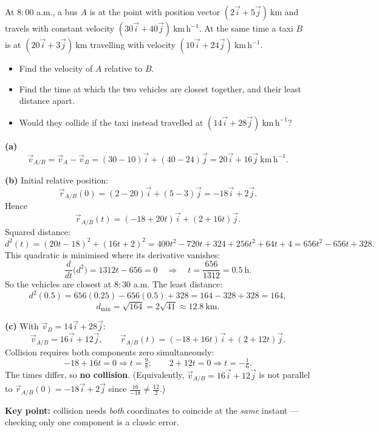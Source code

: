 \documentclass[11pt]{article}
\begin{document}
\begin{exoresolu}
At $8{:}00$ a.m., a bus $A$ is at the point with position vector $(2\vec{i} + 5\vec{j})\ \mathrm{km}$ and travels with constant velocity $(30\vec{i} + 40\vec{j})\ \mathrm{km\,h^{-1}}$. At the same time a taxi $B$ is at $(20\vec{i} + 3\vec{j})\ \mathrm{km}$ travelling with velocity $(10\vec{i} + 24\vec{j})\ \mathrm{km\,h^{-1}}$.
\begin{itemize}
\item[(a)] Find the velocity of $A$ relative to $B$.
\item[(b)] Find the time at which the two vehicles are closest together, and their least distance apart.
\item[(c)] Would they collide if the taxi instead travelled at $(14\vec{i} + 28\vec{j})\ \mathrm{km\,h^{-1}}$?
\end{itemize}
\tcblower
\textbf{(a)}
\[ \vec{v}_{A/B} = \vec{v}_A - \vec{v}_B = (30-10)\vec{i} + (40-24)\vec{j} = 20\vec{i} + 16\vec{j}\ \mathrm{km\,h^{-1}}. \]

\textbf{(b)} Initial relative position:
\[ \vec{r}_{A/B}(0) = (2-20)\vec{i} + (5-3)\vec{j} = -18\vec{i} + 2\vec{j}. \]
Hence
\[ \vec{r}_{A/B}(t) = (-18 + 20t)\vec{i} + (2 + 16t)\vec{j}. \]
Squared distance:
\[ d^2(t) = (20t - 18)^2 + (16t + 2)^2 = 400t^2 - 720t + 324 + 256t^2 + 64t + 4 = 656t^2 - 656t + 328. \]
This quadratic is minimised where its derivative vanishes:
\[ \frac{d}{dt}\big(d^2\big) = 1312t - 656 = 0 \quad\Longrightarrow\quad t = \frac{656}{1312} = 0.5\ \mathrm{h}. \]
So the vehicles are closest at $8{:}30$ a.m. The least distance:
\[ d^2(0.5) = 656(0.25) - 656(0.5) + 328 = 164 - 328 + 328 = 164, \]
\[ d_{\min} = \sqrt{164} = 2\sqrt{41} \approx 12.8\ \mathrm{km}. \]

\textbf{(c)} With $\vec{v}_B = 14\vec{i} + 28\vec{j}$:
\[ \vec{v}_{A/B} = 16\vec{i} + 12\vec{j}, \qquad \vec{r}_{A/B}(t) = (-18 + 16t)\vec{i} + (2 + 12t)\vec{j}. \]
Collision requires both components zero simultaneously:
\[ -18 + 16t = 0 \Rightarrow t = \tfrac{9}{8}; \qquad 2 + 12t = 0 \Rightarrow t = -\tfrac{1}{6}. \]
The times differ, so \textbf{no collision}. (Equivalently, $\vec{v}_{A/B} = 16\vec{i}+12\vec{j}$ is not parallel to $\vec{r}_{A/B}(0) = -18\vec{i} + 2\vec{j}$ since $\frac{16}{-18} \neq \frac{12}{2}$.)

\textbf{Key point:} collision needs \emph{both} coordinates to coincide at the \emph{same} instant — checking only one component is a classic error.
\end{exoresolu}
\end{document}
